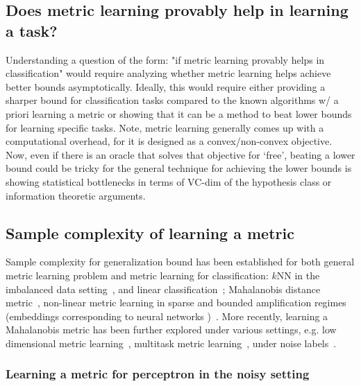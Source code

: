 \subsection{Does metric learning provably help in learning a task?}

Understanding a question of the form: "if metric learning provably helps in classification" would require analyzing whether metric learning helps achieve 
 better bounds asymptotically. Ideally, this would require either providing a sharper bound for classification tasks compared to the known algorithms w/ a priori learning a metric or showing that it can be a method to beat lower bounds for learning specific tasks. Note, metric learning generally comes up with a computational overhead, for it is designed as a convex/non-convex objective. Now, even if there is an oracle that solves that objective for `free', beating a lower bound could be tricky for the general technique for achieving the lower bounds is showing statistical bottlenecks in terms of VC-dim of the hypothesis class or information theoretic arguments. 

 \subsection{Sample complexity of learning a metric}

Sample complexity for generalization bound has been established for both general metric learning problem and metric learning for classification: $k$NN in the imbalanced data setting~\cite{viola20,Gautheron2020MetricLF}, and linear classification~\cite{Bellet2012SimilarityLF}; Mahalanobis distance metric~\cite{Verma2015SampleCO}, non-linear metric learning in sparse and bounded amplification regimes (embeddings corresponding to neural networks )~\cite{Kozdoba2021DimensionFG}.
More recently, learning a Mahalanobis metric has been further explored under various settings, e.g. low dimensional metric learning~\cite{Mason2017LearningLM}, multitask metric learning~\cite{Wang2019MultitaskML}, under noise labels~\cite{Alishahi2023LinearDM}.

\subsubsection{Learning a metric for perceptron in the noisy setting}

